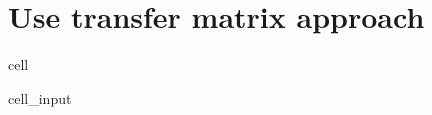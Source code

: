 \documentclass[letterpaper,10pt,english]{jupyterBook}
\begin{document}
\section{Use transfer matrix approach}
\label{\detokenize{Section6:use-transfer-matrix-approach}}
\begin{sphinxuseclass}{cell}\begin{sphinxVerbatimInput}

\begin{sphinxuseclass}{cell_input}
\begin{sphinxVerbatim}[commandchars=\\\{\}]
 
\end{sphinxVerbatim}

\end{sphinxuseclass}\end{sphinxVerbatimInput}

\end{sphinxuseclass}
\end{document}
